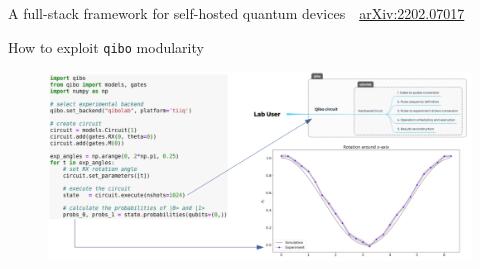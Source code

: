 \documentclass[8pt, xcolor={svgnames}, hyperref={colorlinks,linkcolor=black, citecolor=amethyst, urlcolor=amethyst}]{beamer}
\begin{document}
\begin{frame}{A full-stack framework for self-hosted quantum devices}
\faBook\,\, \href{https://arxiv.org/abs/2202.07017}{arXiv:2202.07017}
\end{frame}

\begin{frame}{How to exploit \texttt{qibo} modularity}
  \begin{figure}
    \centering 
    \includegraphics[width=\textwidth]{figures/qibolab_use.png}
  \end{figure}
\end{frame}
\end{document}
